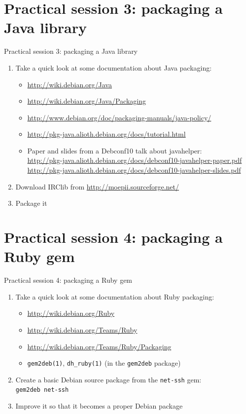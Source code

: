 \documentclass[10pt,final]{beamer}
\begin{document}
\section{Practical session 3: packaging a Java library}
\begin{frame}{Practical session 3: packaging a Java library}
\begin{enumerate}
	\item Take a quick look at some documentation about Java packaging:\\
		\begin{itemize}
		\item \url{http://wiki.debian.org/Java}
      \hbr
		\item \url{http://wiki.debian.org/Java/Packaging}
      \hbr
		\item \url{http://www.debian.org/doc/packaging-manuals/java-policy/}
      \hbr
		\item \url{http://pkg-java.alioth.debian.org/docs/tutorial.html}
      \hbr
		\item Paper and slides from a Debconf10 talk about javahelper:\\
			{\footnotesize
			\url{http://pkg-java.alioth.debian.org/docs/debconf10-javahelper-paper.pdf}\\
			\url{http://pkg-java.alioth.debian.org/docs/debconf10-javahelper-slides.pdf}}
		\end{itemize}
		\br
	\item Download IRClib from \url{http://moepii.sourceforge.net/}
		\br
	\item Package it
\end{enumerate}
\end{frame}

\section{Practical session 4: packaging a Ruby gem}
\begin{frame}{Practical session 4: packaging a Ruby gem}
\begin{enumerate}
	\item Take a quick look at some documentation about Ruby packaging:\\
		\begin{itemize}
		\item \url{http://wiki.debian.org/Ruby}
      \hbr
		\item \url{http://wiki.debian.org/Teams/Ruby}
      \hbr
		\item \url{http://wiki.debian.org/Teams/Ruby/Packaging}
      \hbr
		\item \texttt{gem2deb(1)}, \texttt{dh\_ruby(1)} (in the \texttt{gem2deb} package)
		\end{itemize}
		\hbr
	\item Create a basic Debian source package from the \texttt{net-ssh} gem:\\
		\texttt{gem2deb net-ssh}
	\hbr
	\item Improve it so that it becomes a proper Debian package
\end{enumerate}
\end{frame}
\end{document}
